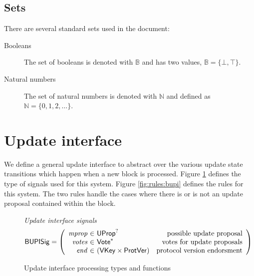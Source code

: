 \documentclass[11pt,a4paper]{article}
\newcommand{\var}[1]{\mathit{#1}}
\newcommand{\fun}[1]{\mathsf{#1}}
\newcommand{\type}[1]{\mathsf{#1}}
\newcommand{\seqof}[1]{#1^{*}}
\newcommand{\VKey}{\type{VKey}}
\begin{document}
\subsection{Sets}
\label{sec:sets}

There are several standard sets used in the document:
%
\begin{description}
\item[Booleans] The set of booleans is denoted with $\mathbb{B}$ and has two
  values, $\mathbb{B} = \{\bot, \top\}$.
\item[Natural numbers] The set of natural numbers is denoted with
  $\mathbb{N}$ and defined as $\mathbb{N} = \{0, 1, 2, \dots\}$.
\end{description}

\section{Update interface}

\newcommand{\bupdprop}[1]{\fun{bUpdProp}\ #1}
\newcommand{\bupdvotes}[1]{\fun{bUpdVotes}\ #1}
\newcommand{\bprotver}[1]{\fun{bProtVer}\ #1}
\newcommand{\bendorsment}[1]{\fun{bEndorsment}\ #1}

\newcommand{\Bupisig}{\type{BUPISig}}

\newcommand{\UPIEnv}{\type{UPIEnv}}
\newcommand{\UPIState}{\type{UPIState}}
\newcommand{\UProp}{\type{UProp}}
\newcommand{\Vote}{\ensuremath{\type{Vote}}}
\newcommand{\ProtVer}{\ensuremath{\type{ProtVer}}}

We define a general update interface to abstract over the various update state
transitions which happen when a new block is processed. Figure
\ref{fig:defs:bupi} defines the type of signals used for this system. Figure
\ref{fig:rules:bupi} defines the rules for this system. The two rules handle the
cases where there is or is not an update proposal contained within the block.

\begin{figure}[ht]
  \emph{Update interface signals}
  \begin{equation*}
    \Bupisig =
    \left(
      \begin{array}{r@{~\in~}lr}
        \var{mprop} & \UProp^{?} & \text{possible update proposal}\\
        \var{votes} & \seqof{\Vote} & \text{votes for update proposals}\\
        \var{end} & (\VKey \times \ProtVer) & \text{protocol version endorsment}
      \end{array}
    \right)
  \end{equation*}

  \caption{Update interface processing types and functions}
  \label{fig:defs:bupi}
\end{figure}
\end{document}

